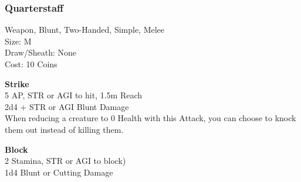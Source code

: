 \subsubsection{Quarterstaff}\label{weapon:quarterstaff}
Weapon, Blunt, Two-Handed, Simple, Melee\\
Size: M\\
Draw/Sheath: None\\
Cost: 10 Coins

\textbf{Strike}\\
5 AP, STR or AGI to hit, 1.5m Reach\\
2d4 + \texttimes STR or AGI Blunt Damage\\
When reducing a creature to 0 Health with this Attack, you can choose to knock them out instead of killing them.

\textbf{Block}\\
2 Stamina, STR or AGI to block)\\
1d4 Blunt or Cutting Damage


